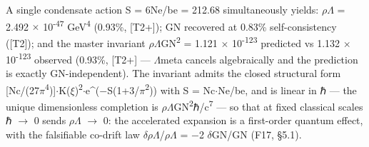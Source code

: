 \documentclass[11pt,letterpaper]{article}
\begin{document}
\noindent A single condensate action S = 6Ne/be = 212.68 simultaneously yields: $\rho$$\Lambda$ = 2.492 $\times$ 10\textsuperscript{-47} GeV\textsuperscript{4} (0.93\%, [T2+]); GN recovered at 0.83\% self-consistency ([T2]); and the master invariant $\rho$$\Lambda$GN\textsuperscript{2} = 1.121 $\times$ 10\textsuperscript{-123} predicted vs 1.132 $\times$ 10\textsuperscript{-123} observed (0.93\%, [T2+] --- $\Lambda$meta cancels algebraically and the prediction is exactly GN-independent). The invariant admits the closed structural form [Nc/(27$\pi$\textsuperscript{4})]$\cdot$K($\xi$)\textsuperscript{2}$\cdot$e\textasciicircum{}($-$S(1+3/$\pi$\textsuperscript{2})) with S = Nc$\cdot$Ne/be, and is linear in ℏ --- the unique dimensionless completion is $\rho$$\Lambda$GN\textsuperscript{2}ℏ/c\textsuperscript{7} --- so that at fixed classical scales ℏ $\to$ 0 sends $\rho$$\Lambda$ $\to$ 0: the accelerated expansion is a first-order quantum effect, with the falsifiable co-drift law $\delta$$\rho$$\Lambda$/$\rho$$\Lambda$ = $-$2 $\delta$GN/GN (F17, §5.1).
\end{document}
